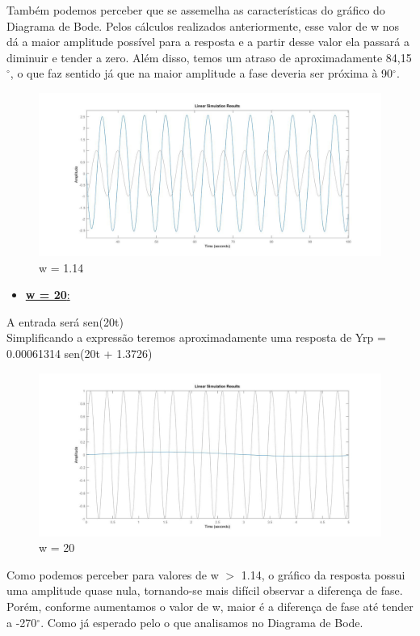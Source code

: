 \documentclass[a4paper,12pt,twoside]{article}
\begin{document}
Também podemos perceber que se assemelha as características do gráfico do Diagrama de Bode. Pelos cálculos realizados anteriormente, esse valor de w nos dá a maior amplitude possível para a resposta e a partir desse valor ela passará a diminuir e tender a zero. Além disso, temos um atraso de aproximadamente 84,15$^{\circ}$, o que faz sentido já que na maior amplitude a fase deveria ser próxima à 90$^{\circ}$. 

\begin{figure}[H]
\centering
\includegraphics[scale=0.3]{w114.jpg}
\caption{w = 1.14}
\label{fig:diagrama}
\end{figure}

\begin{itemize}
    \item \underline{\large{\textbf{w = 20}}:}
\end{itemize}
A entrada será sen(20t)\\
Simplificando a expressão teremos aproximadamente uma resposta de Yrp = 0.00061314 sen(20t + 1.3726)

\begin{figure}[H]
\centering
\includegraphics[scale=0.3]{w20.jpg}
\caption{w = 20}
\label{fig:diagrama}
\end{figure}

Como podemos perceber para valores de w $>$ 1.14, o gráfico da resposta possui uma amplitude quase nula, tornando-se mais difícil observar a diferença de fase. Porém, conforme aumentamos o valor de w, maior é a diferença de fase até tender a -270$^\circ$. Como já esperado pelo o que analisamos no Diagrama de Bode.
\end{document}
